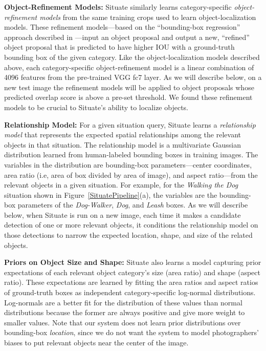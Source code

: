 \documentclass[conference]{IEEEtran}
\begin{document}
{\bf Object-Refinement Models:} Situate similarly learns
category-specific {\it object-refinement models} from the same
training crops used to learn object-localization models.  These
refinement models---based on the ``bounding-box regression'' approach
described in \cite{Girshick2014}---input an object proposal and output
a new, ``refined'' object proposal that is predicted to have higher
IOU with a ground-truth bounding box of the given category.  Like the object-localization models described
above, each category-specific object-refinement model is a linear
combination of 4096 features from the pre-trained VGG fc7 layer.
As we will describe below, on a new test image the refinement models
will be applied to object proposals whose predicted overlap score is
above a pre-set threshold.  We found these refinement models to be
crucial to Situate's ability to localize objects.

{\bf Relationship Model:} For a given situation query, Situate learns a
{\it relationship model} that represents the expected spatial relationships
among the relevant objects in that situation.  The relationship model is a
multivariate Gaussian distribution learned from human-labeled bounding
boxes in training images.  The variables in the distribution are
bounding-box parameters---center coordinates, area ratio (i.e, area of
box divided by area of image), and aspect ratio---from the relevant
objects in a given situation.  For example, for the {\it Walking the
  Dog} situation shown in Figure~\ref{SituatePipeline}(a), the
variables are the bounding-box parameters of the {\it Dog-Walker}, {\it Dog}, and {\it Leash}
boxes.  As we will describe below, when Situate is run on a new image,
each time it makes a candidate detection of one or more relevant
objects, it conditions the relationship model on those detections to narrow
the expected location, shape, and size of the related objects.

{\bf Priors on Object Size and Shape:} Situate also learns a model
capturing prior expectations of each relevant object category's size
(area ratio) and shape (aspect ratio). These expectations are learned
by fitting the area ratios and aspect ratios of ground-truth boxes as
independent category-specific log-normal distributions.  Log-normals
are a better fit for the distribution of these values than normal
distributions because the former are always positive and give more
weight to smaller values.  Note that our system does not learn prior
distributions over bounding-box {\it location}, since we do not want
the system to model photographers' biases to put relevant objects near
the center of the image.
\end{document}
